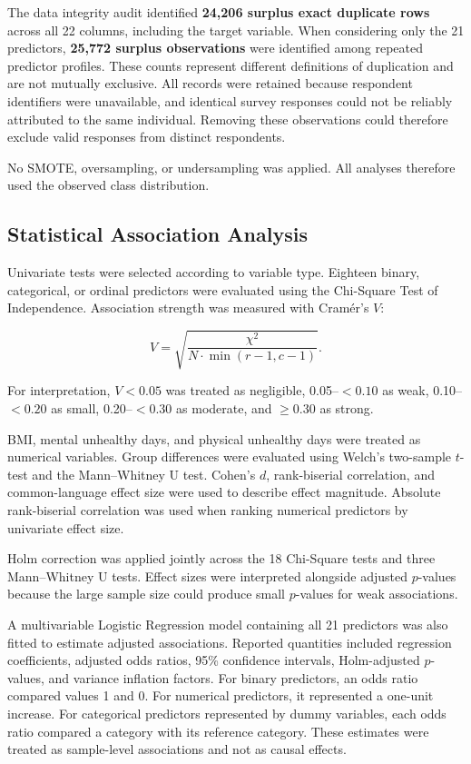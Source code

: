 \documentclass[pdflatex,sn-basic,Numbered]{sn-jnl}
\begin{document}
The data integrity audit identified \textbf{24,206 surplus exact duplicate
rows} across all 22 columns, including the target variable.
When considering only the 21 predictors, \textbf{25,772 surplus observations}
were identified among repeated predictor profiles.
These counts represent different definitions of duplication and are not
mutually exclusive.
All records were retained because respondent identifiers were unavailable,
and identical survey responses could not be reliably attributed to the
same individual.
Removing these observations could therefore exclude valid responses
from distinct respondents.

No SMOTE, oversampling, or undersampling was applied.
All analyses therefore used the observed class distribution.


\subsection{Statistical Association Analysis}
\label{subsec:stats}

Univariate tests were selected according to variable type.
Eighteen binary, categorical, or ordinal predictors were evaluated using
the Chi-Square Test of Independence.
Association strength was measured with Cram{\'e}r's $V$:

\begin{equation}
V =
\sqrt{
\frac{\chi^2}
{N \cdot \min(r-1,c-1)}
}.
\end{equation}

For interpretation, $V<0.05$ was treated as negligible,
0.05--$<0.10$ as weak,
0.10--$<0.20$ as small,
0.20--$<0.30$ as moderate,
and $\geq0.30$ as strong.

BMI, mental unhealthy days, and physical unhealthy days were treated as
numerical variables.
Group differences were evaluated using Welch's two-sample $t$-test and the
Mann--Whitney U test.
Cohen's $d$, rank-biserial correlation, and common-language effect size
were used to describe effect magnitude.
Absolute rank-biserial correlation was used when ranking numerical
predictors by univariate effect size.

Holm correction was applied jointly across the 18 Chi-Square tests
and three Mann--Whitney U tests.
Effect sizes were interpreted alongside adjusted $p$-values because the
large sample size could produce small $p$-values for weak associations.

A multivariable Logistic Regression model containing all 21 predictors was
also fitted to estimate adjusted associations.
Reported quantities included regression coefficients, adjusted odds
ratios, 95\% confidence intervals, Holm-adjusted $p$-values, and variance
inflation factors.
For binary predictors, an odds ratio compared values 1 and 0.
For numerical predictors, it represented a one-unit increase.
For categorical predictors represented by dummy variables, each odds
ratio compared a category with its reference category.
These estimates were treated as sample-level associations and not as
causal effects.
\end{document}
